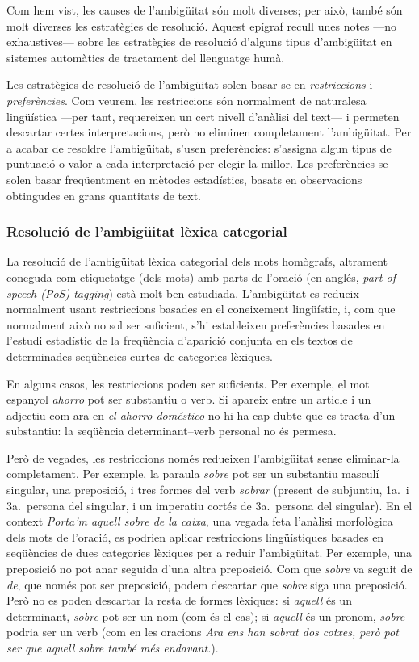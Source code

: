 Com hem vist, les causes de l'ambigüitat són molt diverses; per això,
també són molt diverses les estratègies de resolució. Aquest epígraf
recull unes notes ---no exhaus\-tives--- sobre les estratègies de
resolució d'alguns tipus d'ambigüitat en sistemes automàtics de
tractament del llenguatge humà.

Les estratègies de resolució de l'ambigüitat solen basar-se en
\emph{restriccions} i \emph{preferències}. Com veurem, les
restriccions són normalment de naturalesa lingüística ---per tant,
requereixen un cert nivell d'anàlisi del text--- i permeten descartar
certes interpretacions, però no eliminen completament l'ambigüitat.
Per a acabar de resoldre l'ambigüitat, s'usen preferències: s'assigna
algun tipus de puntuació o valor a cada interpretació per elegir la
millor. Les preferències se solen basar freqüentment en mètodes
estadístics, basats en observacions obtingudes en grans quantitats de
text.

\subsubsection{Resolució de l'ambigüitat lèxica categorial}
\label{s3:reshom}
La resolució de l'ambigüitat lèxica categorial dels mots homògrafs,
altrament coneguda com etiquetatge (dels mots) amb parts de l'oració
(en anglés, \emph{part-of-speech (PoS) tagging}) està molt ben
estudiada.  L'ambigüitat es redueix normalment usant restriccions
basades en el coneixement lingüístic, i, com que normalment això no
sol ser suficient, s'hi estableixen preferències basades en l'estudi
estadístic de la freqüència d'aparició conjunta en els textos de
determinades seqüències curtes de categories lèxiques.

En alguns casos, les restriccions poden ser suficients. Per exemple,
el mot espanyol \emph{ahorro} pot ser substantiu o verb. Si apareix
entre un article i un adjectiu com ara en \emph{el ahorro doméstico}
no hi ha cap dubte que es tracta d'un substantiu: la seqüència
determinant--verb personal no és permesa.

Però de vegades, les restriccions només redueixen l'ambigüitat sense
eliminar-la completament.  Per exemple, la paraula \emph{sobre} pot
ser un substantiu masculí singular, una preposició, i tres formes del
verb \emph{sobrar} (present de subjuntiu, 1a.\ i 3a.\ persona del
singular, i un imperatiu cortés de 3a.\ persona del singular). En el
context \emph{Porta'm aquell sobre de la caixa}, una vegada feta
l'anàlisi morfològica dels mots de l'oració, es podrien aplicar
restriccions lingüístiques basades en seqüències de dues categories
lèxiques per a reduir l'ambigüitat. Per exemple, una preposició no pot
anar seguida d'una altra preposició. Com que \emph{sobre} va seguit de
\emph{de}, que només pot ser preposició, podem descartar que
\emph{sobre} siga una preposició. Però no es poden descartar la resta
de formes lèxiques: si \emph{aquell} és un determinant, \emph{sobre}
pot ser un nom (com és el cas); si \emph{aquell} és un pronom,
\emph{sobre} podria ser un verb (com en les oracions \emph{Ara ens han
  sobrat dos cotxes, però pot ser que aquell sobre també més
  endavant.}).

